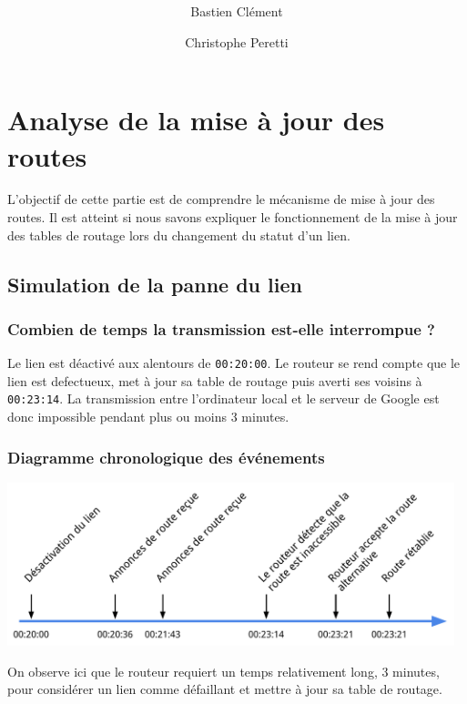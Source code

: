 \documentclass[11pt,a4paper]{article}
\author{Bastien Clément \and Christophe Peretti}
\title{{\normalsize \doccourse} \\ \doctitle }
\begin{document}
\maketitle
\vspace{1em}

\section{Analyse de la mise à jour des routes}

L'objectif de cette partie est de comprendre le mécanisme de mise à jour des routes. Il est atteint si nous savons expliquer le fonctionnement de la mise à jour des tables de routage lors du changement du statut d’un lien.

\subsection{Simulation de la panne du lien}

\subsubsection*{Combien de temps la transmission est-elle interrompue ?}

Le lien est déactivé aux alentours de \texttt{00:20:00}. Le routeur se rend compte que le lien est defectueux, met à jour sa table de routage puis averti ses voisins à \texttt{00:23:14}. La transmission entre l'ordinateur local et le serveur de Google est donc impossible pendant plus ou moins 3 minutes.

\subsubsection*{Diagramme chronologique des événements}

\begin{center}
\includegraphics[width=13cm]{img_down}
\end{center}

On observe ici que le routeur requiert un temps relativement long, 3 minutes, pour considérer un lien comme défaillant et mettre à jour sa table de routage.
\end{document}
